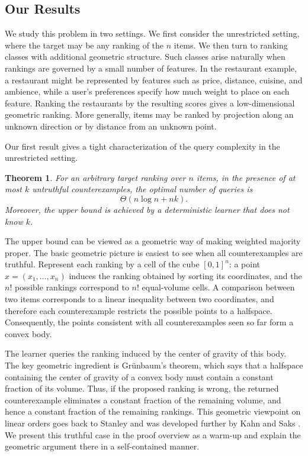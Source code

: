 \documentclass[11pt]{article}
\newtheorem{theorem}{Theorem}[section]
\theoremstyle{definition}
\theoremstyle{remark}
\begin{document}
\subsection{Our Results}
We study this problem in two settings. We first consider the unrestricted
setting, where the target may be any ranking of the $n$ items. We then turn
to ranking classes with additional geometric structure. 
Such classes arise naturally when rankings are governed by a small number of
features. In the restaurant example, a restaurant might be represented by
features such as price, distance, cuisine, and ambience, while a user's
preferences specify how much weight to place on each feature. Ranking the
restaurants by the resulting scores gives a low-dimensional geometric
ranking. More generally, items may be ranked by projection along an unknown
direction or by distance from an unknown point.

Our first result gives a tight characterization of the query complexity in
the unrestricted setting.
\begin{theorem}
For an arbitrary target ranking over $n$ items, in the presence of at most
$k$ untruthful counterexamples, the optimal number of queries is
\[
    \Theta(n\log n + nk).
\]
Moreover, the upper bound is achieved by a deterministic learner that
does not know $k$.
\end{theorem}

The upper bound can be viewed as a geometric way of making weighted majority
proper. The basic geometric picture is easiest to see when all
counterexamples are truthful. Represent each ranking by a cell of the cube
$[0,1]^n$: a point $x=(x_1,\ldots,x_n)$ induces the ranking obtained by
sorting its coordinates, and the $n!$ possible rankings correspond to
$n!$ equal-volume cells. A comparison between two items corresponds to a
linear inequality between two coordinates, and therefore each
counterexample restricts the possible points to a halfspace. Consequently,
the points consistent with all counterexamples seen so far form a convex
body.

The learner queries the ranking induced by the center of gravity of this
body. The key geometric ingredient is Gr\"unbaum's theorem, which says that a halfspace containing the center of gravity of a convex
body must contain a constant fraction of its volume. Thus, if the proposed
ranking is wrong, the returned counterexample eliminates a constant fraction
of the remaining volume, and hence a constant fraction of the remaining
rankings. This geometric viewpoint on linear orders goes back to Stanley
\cite{Stanley1981} and was developed further by Kahn and Saks
\cite{KahnSaks1984}. We present this truthful case in the proof overview as
a warm-up and explain the geometric argument there in a self-contained
manner.
\end{document}
